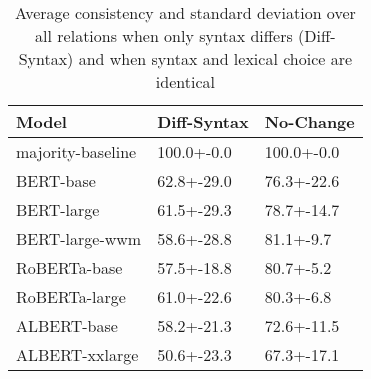 \begin{table}[t]
    \centering
\begin{tabular}{lll}
\toprule
Model & Diff-Syntax & No-Change \\
\midrule
majority-baseline &            100.0+-0.0 &            100.0+-0.0 \\
\midrule
BERT-base         &            62.8+-29.0 &            76.3+-22.6 \\
BERT-large        &            61.5+-29.3 &            78.7+-14.7 \\
BERT-large-wwm    &            58.6+-28.8 &             81.1+-9.7 \\
\midrule
RoBERTa-base      &            57.5+-18.8 &             80.7+-5.2 \\
RoBERTa-large     &            61.0+-22.6 &             80.3+-6.8 \\
\midrule
ALBERT-base       &            58.2+-21.3 &            72.6+-11.5 \\
ALBERT-xxlarge    &            50.6+-23.3 &            67.3+-17.1 \\
\bottomrule
\end{tabular}

    \caption{Average consistency and standard deviation over
      all relations when only  syntax differs
      (Diff-Syntax) and when syntax and lexical choice are   identical}
    \label{tab:syntax_results}
\end{table}
